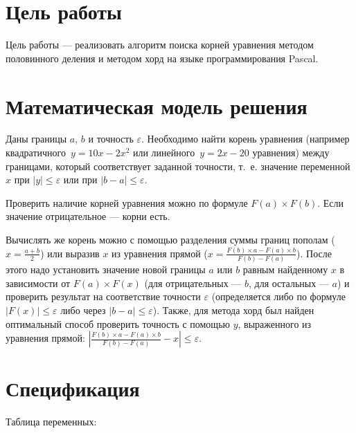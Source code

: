 \documentclass[a4paper]{article}
\begin{document}

\fontsize{14pt}{18pt}
\selectfont

\section{Цель работы}
Цель работы --- реализовать алгоритм поиска корней уравнения
методом половинного деления и методом хорд на языке программирования Pascal.

\section{Математическая модель решения}
Даны границы $a$, $b$ и точность $\varepsilon$.
Необходимо найти корень уравнения
(например квадратичного~$y=10x-2x^2$ или линейного~$y=2x-20$ уравнения)
между границами, который соответствует заданной точности,
т.~е. значение переменной $x$ при
$|y| \le \varepsilon$ или при $|b-a|\le\varepsilon$.

Проверить наличие корней уравнения можно по формуле $F(a)\times F(b)$.
Если значение отрицательное --- корни есть.

Вычислять же корень можно с помощью разделения суммы границ пополам
($x=\frac{a+b}{2}$) или выразив $x$ из
уравнения прямой ($x=\frac{F(b)\times a-F(a) \times b}{F(b)-F(a)}$).
После этого надо установить значение новой границы $a$ или $b$
равным найденному $x$ в зависимости от $F(a)\times F(x)$
(для отрицательных --- $b$, для остальных --- $a$)
и проверить результат на соответствие точности $\varepsilon$
(определяется либо по формуле $|F(x)|\le\varepsilon$
либо через $|b-a|\le\varepsilon$).
Также, для метода хорд был найден оптимальный способ проверить точность
с помощью $y$, выраженного из уравнения прямой:
$|\frac{F(b)\times a-F(a) \times b}{F(b)-F(a)}-x|\le\varepsilon$.

\section{Спецификация}
Таблица переменных:
\end{document}
